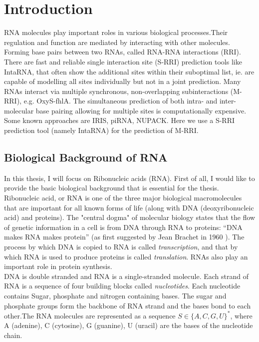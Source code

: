 \documentclass[twoside,a4paper]{report}
\begin{document}
	
	
	\tableofcontents
	 	
	\chapter{Introduction}
	RNA molecules play important roles in various biological processes.Their regulation and function are mediated by interacting with other molecules. 	Forming base pairs between two RNAs, called RNA-RNA interactions (RRI). There are fast and reliable single interaction site (S-RRI) prediction tools like IntaRNA, that often show the additional sites within their suboptimal list, ie. are capable of modelling all sites individually but not in a joint prediction. Many RNAs interact via multiple synchronous, non-overlapping subinteractions (M-RRI), e.g. OxyS-fhlA. The simultaneous prediction of both intra- and inter-molecular base pairing allowing for multiple sites is computationally expensive. Some known approaches are IRIS, piRNA, NUPACK. Here we use a S-RRI prediction tool (namely IntaRNA) for the prediction of M-RRI.
	
	\section{Biological Background of RNA}
	In this thesis, I will focus on Ribonucleic acids (RNA). First of all, I would like to provide the basic biological background that is essential for the thesis. Ribonucleic acid, or RNA is one of the three major biological macromolecules that are important for all known forms of life (along with DNA (deoxyribonucleic acid) and proteins). The "central dogma" of molecular biology states that the flow of genetic information in a cell is from DNA through RNA to proteins: “DNA makes RNA makes protein” (as first suggested by Jean Brachet in 1960 )\citep{brachet1956remarks}. The process by which DNA is copied to RNA is called \textit{transcription}, and that by which RNA is used to produce proteins is called \textit{translation}. RNAs also play an important role in protein synthesis. \\
	
	 DNA is double stranded and RNA is a single-stranded molecule. Each strand of RNA is a sequence of four building blocks called \textit{nucleotides}. Each nucleotide contains Sugar, phosphate and nitrogen containing bases. The sugar and phosphate groups form the backbone of RNA strand and the bases bond to each other.The RNA molecules are represented as a sequence $S \in \{A, C, G, U\} ^*$, where A (adenine), C (cytosine), G (guanine), U (uracil) are the bases of the nucleotide chain.\\
	 
\end{document}
